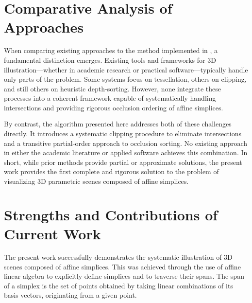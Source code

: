 \section{Comparative Analysis of Approaches}

When comparing existing approaches to the method implemented in 
\luatikztdtools{}, a fundamental distinction emerges. Existing 
tools and frameworks for \(3\)D illustration—whether in academic 
research or practical software—typically handle only parts of the 
problem. Some systems focus on tessellation, others on clipping, 
and still others on heuristic depth-sorting. However, none integrate 
these processes into a coherent framework capable of systematically 
handling intersections and providing rigorous occlusion ordering of 
affine simplices. 

By contrast, the algorithm presented here addresses both of these 
challenges directly. It introduces a systematic clipping procedure 
to eliminate intersections and a transitive partial-order approach 
to occlusion sorting. No existing approach in either the academic 
literature or applied software achieves this combination. In short, 
while prior methods provide partial or approximate solutions, the 
present work provides the first complete and rigorous solution to 
the problem of visualizing \(3\)D parametric scenes composed of 
affine simplices.

\section{Strengths and Contributions of Current Work}

The present work successfully demonstrates the systematic 
illustration of \(3\)D scenes composed of affine simplices. 
This was achieved through the use of affine linear algebra to 
explicitly define simplices and to traverse their spans. The span 
of a simplex is the set of points obtained by taking linear 
combinations of its basis vectors, originating from a given point. 

